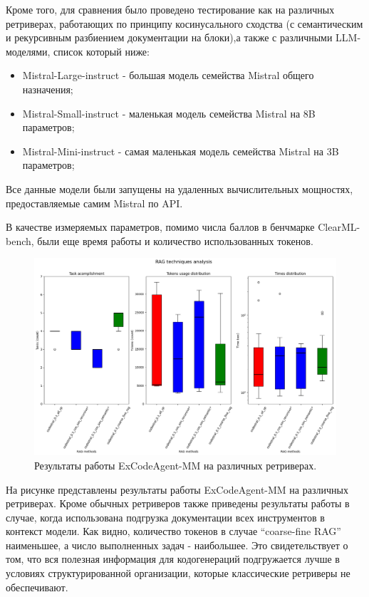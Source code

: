 Кроме того, для сравнения было проведено тестирование как на различных ретриверах, 
работающих по принципу косинусального сходства (с семантическим и рекурсивным 
разбиением документации на блоки),а также с различными LLM-моделями, список который ниже:
\begin{itemize}
    \item Mistral-Large-instruct - большая модель семейства Mistral общего назначения;
    \item Mistral-Small-instruct - маленькая модель семейства Mistral на 8B параметров;
    \item Mistral-Mini-instruct - самая маленькая модель семейства Mistral на 3B параметров;
\end{itemize} 
Все данные модели были запущены на удаленных вычислительных мощностях, предоставляемые
самим Mistral по API.

В качестве измеряемых параметров, помимо числа баллов в бенчмарке ClearML-bench, были
еще время работы и количество использованных токенов.

\begin{figure}
    \center
	\includegraphics[scale=0.42]{sources/stats_1.png}
	\caption{Результаты работы ExCodeAgent-MM на различных ретриверах.} 
	\label{fig:ch4:rags}  
\end{figure}

На рисунке  представлены результаты работы ExCodeAgent-MM на различных ретриверах. Кроме 
обычных ретриверов также приведены результаты работы в случае, когда использована подгрузка
документации всех инструментов в контекст модели. Как видно, количество токенов в случае
``coarse-fine RAG'' наименьшее, а число выполненных задач - наибольшее. Это свидетельствует
о том, что вся полезная информация для кодогенераций подгружается лучше в условиях 
структурированной организации, которые классические ретриверы не обеспечивают.

